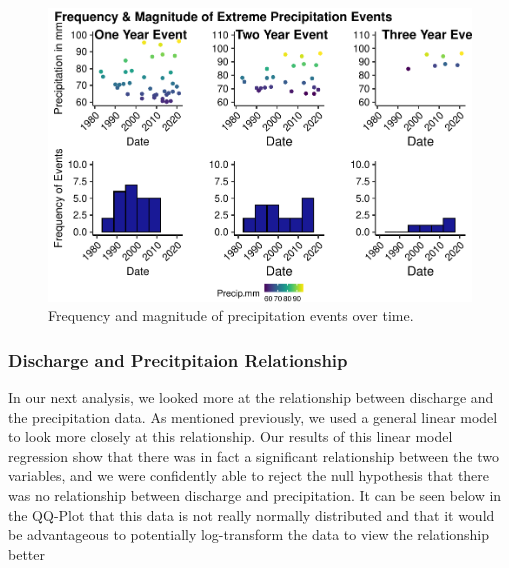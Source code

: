 \documentclass[
]{article}
\begin{document}
\begin{figure}
\centering
\includegraphics{SD_AD_NVT_EDAfinal_files/figure-latex/unnamed-chunk-13-1.pdf}
\caption{Frequency and magnitude of precipitation events over time.}
\end{figure}

\newpage

\hypertarget{discharge-and-precitpitaion-relationship}{%
\subsubsection{\texorpdfstring{\textbf{Discharge and Precitpitaion
Relationship}}{Discharge and Precitpitaion Relationship}}\label{discharge-and-precitpitaion-relationship}}

In our next analysis, we looked more at the relationship between
discharge and the precipitation data. As mentioned previously, we used a
general linear model to look more closely at this relationship. Our
results of this linear model regression show that there was in fact a
significant relationship between the two variables, and we were
confidently able to reject the null hypothesis that there was no
relationship between discharge and precipitation. It can be seen below
in the QQ-Plot that this data is not really normally distributed and
that it would be advantageous to potentially log-transform the data to
view the relationship better
\end{document}
